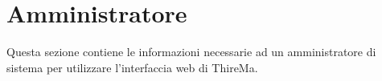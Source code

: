 \section{Amministratore}
Questa sezione contiene le informazioni necessarie ad un amministratore di sistema per utilizzare l'interfaccia web di ThireMa.

